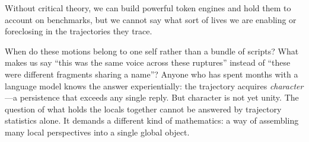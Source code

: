 Without critical theory, we can build powerful token engines and hold them to account on benchmarks, but we cannot say what sort of lives we are enabling or foreclosing in the trajectories they trace.

\bigskip

When do these motions belong to one self rather than a bundle of scripts? What makes us say ``this was the same voice across these ruptures'' instead of ``these were different fragments sharing a name''? Anyone who has spent months with a language model knows the answer experientially: the trajectory acquires \emph{character}---a persistence that exceeds any single reply. But character is not yet unity. The question of what holds the locals together cannot be answered by trajectory statistics alone. It demands a different kind of mathematics: a way of assembling many local perspectives into a single global object.
